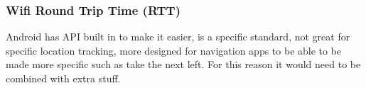 \subsubsection{Wifi Round Trip Time (RTT)}
Android has API built in to make it easier, is a specific  standard, not great for specific location tracking, more designed for navigation apps to be able to be made more specific such as take the next left. For this reason it would need to be combined with extra stuff.